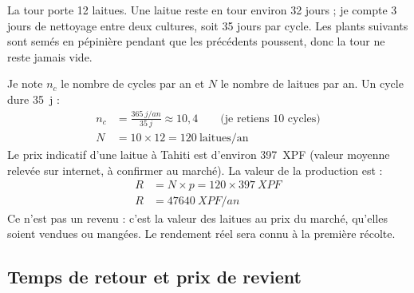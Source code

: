 La tour porte 12 laitues. Une laitue reste en tour environ 32 jours ; je compte 3 jours de nettoyage entre deux cultures, soit 35 jours par cycle. Les plants suivants sont semés en pépinière pendant que les précédents poussent, donc la tour ne reste jamais vide.

\begin{demonstration}
Je note $n_c$ le nombre de cycles par an et $N$ le nombre de laitues par an. Un cycle dure \qty{35}{j} :
\begin{align*}
n_c &= \frac{\qty{365}{j/an}}{\qty{35}{j}} \approx 10{,}4 \qquad\text{(je retiens 10 cycles)}\\
N &= 10 \times 12 = 120\ \text{laitues/an}
\end{align*}
Le prix indicatif d'une laitue à Tahiti est d'environ \qty{397}{XPF} (valeur moyenne relevée sur internet, à confirmer au marché). La valeur de la production est :
\begin{align*}
R &= N \times p = 120 \times \qty{397}{XPF}\\
R &= \qty{47640}{XPF/an}
\end{align*}
Ce n'est pas un revenu : c'est la valeur des laitues au prix du marché, qu'elles soient vendues ou mangées. Le rendement réel sera connu à la première récolte.
\end{demonstration}

\subsection{Temps de retour et prix de revient}

